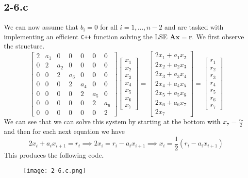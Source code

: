 \documentclass{article}
\begin{document}
\subsection*{2-6.c}
We can now assume that $b_{i} = 0$ for all $i = 1,\dots, n-2$ and are tasked with implementing an efficient \verb|C++| function solving the LSE $\mathbf{A}\mathbf{x} = \mathbf{r}$. We first observe the structure.
\begin{equation*}
    \begin{bmatrix}
    2 & a_{1} & 0 & 0 & 0 & 0& 0 \\
    0 & 2 & a_{2} & 0 & 0& 0 & 0 \\
    0 & 0 & 2 & a_{3} & 0 & 0& 0 \\
    0 & 0 & 0& 2& a_{4} & 0& 0\\
    0 & 0 &0 & 0 & 2 & a_{5} & 0\\
    0 & 0 & 0 & 0 & 0 & 2 & a_{6} \\
    0  & 0 & 0 & 0 & 0 & 0 & 2
    \end{bmatrix}
    \begin{bmatrix}
        x_{1} \\ x_{2} \\ x_{3} \\ x_{4} \\ x_{5} \\ x_{6} \\ x_{7}
    \end{bmatrix} =
    \begin{bmatrix}
        2x_{1} + a_{1}x_{2} \\
        2x_{2} + a_{2}x_{3} \\
        2x_{3} + a_{3}x_{4} \\
        2x_{4} + a_{4}x_{5} \\
        2x_{5} + a_{5}x_{6} \\
        2x_{6} + a_{6}x_{7} \\
        2x_{7}
    \end{bmatrix} = \begin{bmatrix}
        r_{1} \\ r_{2}  \\ r_{3} \\ r_{4} \\ r_{5} \\ r_{6} \\ r_{7}
    \end{bmatrix}
\end{equation*}
We can see that we can solve this system by starting at the bottom with $x_{7} = \frac{r_{7}}{2}$ and then for each next equation we have
\begin{equation*}
    2x_{i} + a_{i}x_{i+1} = r_{i} \implies 2x_{i} = r_{i} - a_{i}x_{i+1} \implies x_{i} = \frac{1}{2}\left(r_{i} - a_{i}x_{i+1}\right)
\end{equation*}
This produces the following code.
\begin{figure}[!hbt]
    \centering
\texttt{[image: 2-6.c.png]}
\end{figure}
\end{document}
